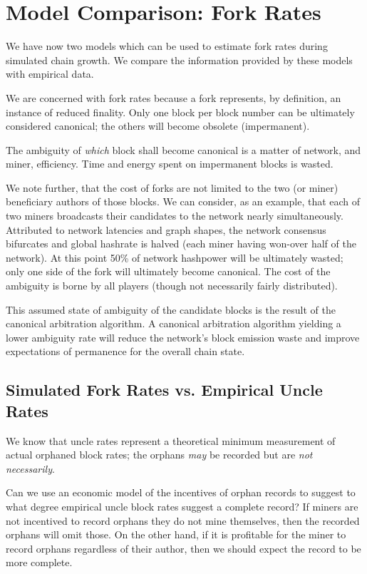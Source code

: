 \documentclass[11pt]{article}
\theoremstyle{plain}
\begin{document}
{%

\section{\normalsize{Model Comparison: Fork Rates}}

We have now two models which can be used to estimate fork rates during
simulated chain growth. We compare the information provided by these models with
empirical data.

We are concerned with fork rates because a fork represents, by definition, an
instance of reduced finality. Only one block per block number can be ultimately
considered canonical; the others will become obsolete (impermanent).

The ambiguity of \emph{which} block shall become canonical is a matter of
network, and miner, efficiency. Time and energy spent on impermanent blocks is 
wasted.

We note further, that the cost of forks are not limited to the two (or miner)
beneficiary authors of those blocks. We can consider, as an example, that each
of two miners broadcasts their candidates to the network nearly simultaneously.
Attributed to network latencies and graph shapes, the network consensus bifurcates
and global hashrate is halved (each miner having won-over half of the network).
At this point 50\% of network hashpower will be ultimately wasted; only one
side of the fork will ultimately become canonical. The cost of the ambiguity is
borne by all players (though not necessarily fairly distributed).

This assumed state of ambiguity of the candidate blocks is the result of the
canonical arbitration algorithm. A canonical arbitration algorithm yielding a
lower ambiguity rate will reduce the network's block emission waste and improve
expectations of permanence for the overall chain state.

\subsection{\normalsize{Simulated Fork Rates vs. Empirical Uncle Rates}}

We know that uncle rates represent a theoretical minimum measurement of actual
orphaned block rates; the orphans \emph{may} be recorded but are \emph{not
necessarily}.

Can we use an economic model of the incentives of orphan records to suggest to
what degree empirical uncle block rates suggest a complete record?
If miners are not incentived to record orphans they do not mine themselves,
then the recorded orphans will omit those. On the other hand, if it is
profitable for the miner to record orphans regardless of their author, then we
should expect the record to be more complete.

}
\end{document}
